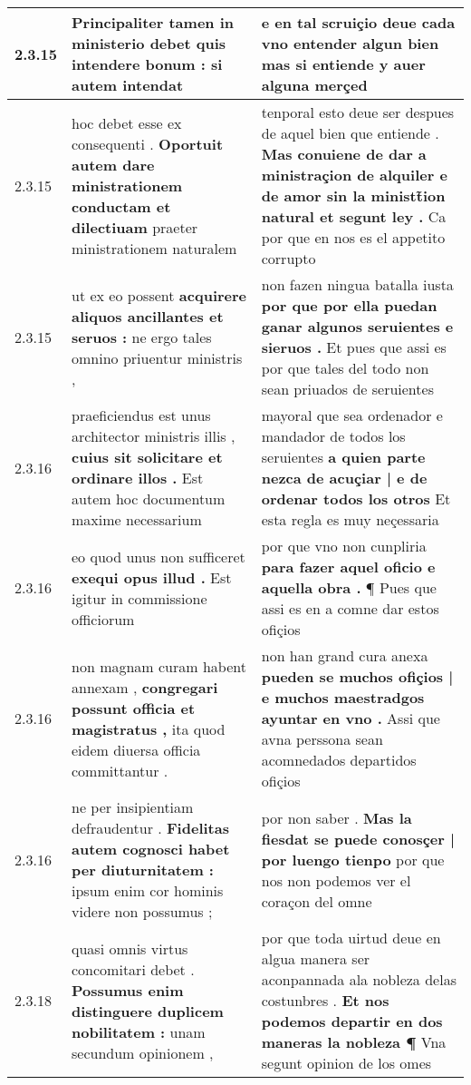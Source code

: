 \begin{tabular}{|p{1cm}|p{6.5cm}|p{6.5cm}|}
2.3.15 & Principaliter tamen in ministerio debet \textbf{ quis intendere bonum : } si autem intendat & e en tal scruiçio \textbf{ deue cada vno entender algun bien } mas si entiende y auer alguna merçed \\\hline
2.3.15 & hoc debet esse ex consequenti . \textbf{ Oportuit autem dare ministrationem conductam et dilectiuam } praeter ministrationem naturalem & tenporal esto deue ser despues de aquel bien que entiende . \textbf{ Mas conuiene de dar a ministraçion de alquiler e de amor sin la ministt̃ion natural et segunt ley . } Ca por que en nos es el appetito corrupto \\\hline
2.3.15 & ut ex eo possent \textbf{ acquirere aliquos ancillantes et seruos : } ne ergo tales omnino priuentur ministris , & non fazen ningua batalla iusta \textbf{ por que por ella puedan ganar algunos seruientes e sieruos . } Et pues que assi es por que tales del todo non sean priuados de seruientes \\\hline
2.3.16 & praeficiendus est unus architector ministris illis , \textbf{ cuius sit solicitare et ordinare illos . } Est autem hoc documentum maxime necessarium & mayoral que sea ordenador e mandador de todos los seruientes \textbf{ a quien parte nezca de acuçiar | e de ordenar todos los otros } Et esta regla es muy neçessaria \\\hline
2.3.16 & eo quod unus non sufficeret \textbf{ exequi opus illud . } Est igitur in commissione officiorum & por que vno non cunpliria \textbf{ para fazer aquel oficio e aquella obra . } ¶ Pues que assi es en a comne dar estos ofiçios \\\hline
2.3.16 & non magnam curam habent annexam , \textbf{ congregari possunt officia et magistratus , } ita quod eidem diuersa officia committantur . & non han grand cura anexa \textbf{ pueden se muchos ofiçios | e muchos maestradgos ayuntar en vno . } Assi que avna perssona sean acomnedados departidos ofiçios \\\hline
2.3.16 & ne per insipientiam defraudentur . \textbf{ Fidelitas autem cognosci habet per diuturnitatem : } ipsum enim cor hominis videre non possumus ; & por non saber . \textbf{ Mas la fiesdat se puede conosçer | por luengo tienpo } por que nos non podemos ver el coraçon del omne \\\hline
2.3.18 & quasi omnis virtus concomitari debet . \textbf{ Possumus enim distinguere duplicem nobilitatem : } unam secundum opinionem , & por que toda uirtud deue en algua manera ser aconpannada ala nobleza delas costunbres . \textbf{ Et nos podemos departir en dos maneras la nobleza ¶ } Vna segunt opinion de los omes \\\hline

\end{tabular}
